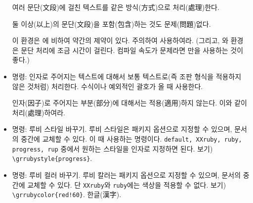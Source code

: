 \documentclass[a4paper,12pt,itemph,footnote]{oblivoir}
\begin{document}
\begin{itemize}
\begin{tcolorbox}
\tcbuselistinglisting
\end{tcolorbox}

\begin{tcolorbox}
\begin{grrubypars}
여러 문단(文段)에 걸친 텍스트를 같은 방식(方式)으로 처리(處理)한다.

둘 이상(以上)의 문단(文段)을 포함(包含)하는 것도 문제(問題)없다.
\end{grrubypars}
\end{tcolorbox}

이 환경은 에 비하여 약간의 제약이 있다. 주의하여 사용하여라.
(그리고, 와  환경은 문단 처리에 조금 시간이 걸린다.
컴파일 속도가 문제라면 \mycmd{\grfoo}만을 사용하는 것이 좋다.)

\item\mycmd{\OffStuff} 명령: 인자로 주어지는 텍스트에 대해서 보통 텍스트로(즉 조판 형식을 적용하지 않은 것처럼) 처리한다. 수식이나 예외적인 괄호가 올 때 사용한다.
\begin{myexam}[]
\begin{grruby}
인자(因子)로 주어지는 부분(部分)에 대해서는 
 적용(適用)하지 않는다.
 이와 같이 
처리(處理)하여라.
\end{grruby}
\end{myexam}

\item \mycmd{\grrubystyle} 명령: 루비 스타일 바꾸기. 루비 스타일은 패키지 옵션으로 지정할 수 있으며, 문서의 중간에 교체할 수 있다. 이 때 사용하는 명령이다. \texttt{default, XXruby, ruby, progress, rup} 중에서 원하는 
스타일을 인자로 지정하면 된다. 보기) \verb|\grrubystyle{progress}|.


\item \mycmd{\grrubycolor} 명령: 루비 컬러 바꾸기. 루비 칼러는 패키지 옵션으로 지정할 수 있으며, 문서의 중간에 교체할 수 있다. 단 \texttt{XXruby}와 \texttt{ruby}에는 색상을 적용할 수 없다. 보기) \verb|\grrubycolor{red!60}|. {\grfoo 한글(漢字).}


\end{itemize}
\end{document}
